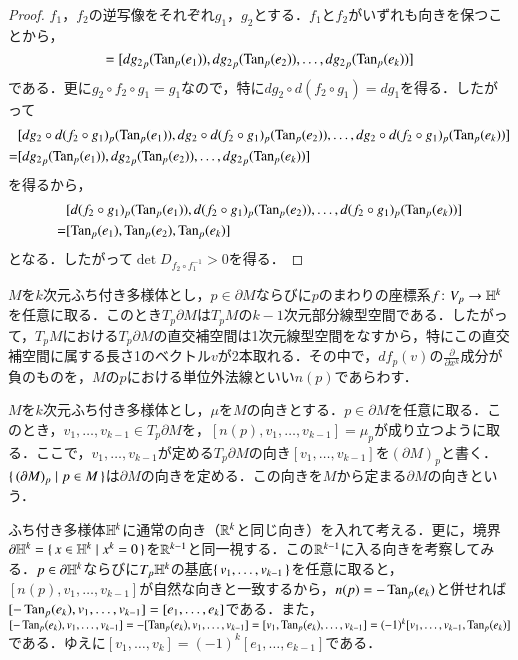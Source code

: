 \begin{proof}$f_1$，$f_2$の逆写像をそれぞれ$g_1$，$g_2$とする．$f_1$と$f_2$がいずれも向きを保つことから，
\begin{equation}
[d{g_1}_p(\Tan_p(e_1)), d{g_1}_p(\Tan_p(e_2)), \dots, d{g_1}_p(\Tan_p(e_k))] = [d{g_2}_p(\Tan_p(e_1)), d{g_2}_p(\Tan_p(e_2)), \dots, d{g_2}_p(\Tan_p(e_k))]
\end{equation}
である．更に$g_2 \circ f_2 \circ g_1 = g_1$なので，特に$dg_2 \circ d(f_2 \circ g_1) = dg_1$を得る．したがって
\begin{align}
& [dg_2 \circ d(f_2 \circ g_1)_p(\operatorname{Tan}_p(e_1)), dg_2 \circ d(f_2 \circ g_1)_p(\operatorname{Tan}_p(e_2)), \dots, dg_2 \circ d(f_2 \circ g_1)_p(\operatorname{Tan}_p(e_k))] \\
= &[d{g_2}_p(\operatorname{Tan}_p(e_1)), d{g_2}_p(\operatorname{Tan}_p(e_2)), \dots, d{g_2}_p(\operatorname{Tan}_p(e_k))]
\end{align}を得るから，
\begin{align}
& [d(f_2 \circ g_1)_p(\operatorname{Tan}_p(e_1)), d(f_2 \circ g_1)_p(\operatorname{Tan}_p(e_2)), \dots, d(f_2 \circ g_1)_p(\operatorname{Tan}_p(e_k))] \\
= &[\operatorname{Tan}_p(e_1), \operatorname{Tan}_p(e_2), \operatorname{Tan}_p(e_k)]
\end{align}となる．したがって$\det D_{f_2 \circ f_1^{-1}} > 0$を得る．
\end{proof}

\begin{defi}
$M$を$k$次元ふち付き多様体とし，$p \in \partial M$ならびに$p$のまわりの座標系$f \colon V_p \to \mathbb{H}^k$を任意に取る．このとき$T_p \partial M$は$T_pM$の$k-1$次元部分線型空間である．したがって，$T_pM$における$T_p \partial M$の直交補空間は1次元線型空間をなすから，特にこの直交補空間に属する長さ1のベクトル$v$が2本取れる．その中で，$df_p(v)$の$\frac{\partial}{\partial x^k}$成分が負のものを，$M$の$p$における単位外法線といい$n(p)$であらわす．
\end{defi}

\begin{defi}
$M$を$k$次元ふち付き多様体とし，$\mu$を$M$の向きとする．$p \in \partial M$を任意に取る．このとき，$v_1, \dots, v_{k-1} \in T_p \partial M$を，$[n(p), v_1, \dots, v_{k-1}] = \mu_p$が成り立つように取る．ここで，$v_1, \dots, v_{k-1}$が定める$T_p \partial M$の向き$[v_1, \dots, v_{k-1}]$を$(\partial M)_p$と書く．$\set{(\partial M)_p | p \in M}$は$\partial M$の向きを定める．この向きを$M$から定まる$\partial M$の向きという．
\end{defi}

\begin{exm}
ふち付き多様体$\mathbb{H}^k$に通常の向き（$\mathbb{R}^k$と同じ向き）を入れて考える．更に，境界$\partial \mathbb{H}^k = \set{x \in \mathbb{H}^k | x^k=0 }$を$\mathbb{R}^{k-1}$と同一視する．この$\mathbb{R}^{k-1}$に入る向きを考察してみる．$p \in \partial \mathbb{H}^k$ならびに$T_p\mathbb{H}^k$の基底$\set{v_1, \dots, v_{k-1}}$を任意に取ると，$[n(p), v_1, \dots, v_{k-1}]$が自然な向きと一致するから，$n(p) = -\operatorname{Tan}_p(e_k)$と併せれば$[-\operatorname{Tan}_p(e_{k}), v_1, \dots, v_{k-1}] = [e_1, \dots, e_k]$である．また，$[-\operatorname{Tan}_p(e_{k}), v_1, \dots, v_{k-1}] = -[\operatorname{Tan}_p(e_{k}), v_1, \dots, v_{k-1}] = [v_1, \operatorname{Tan}_p(e_{k}), \dots, v_{k-1}] = (-1)^k [v_1, \dots, v_{k-1}, \operatorname{Tan}_p(e_{k})]$である．ゆえに$[v_1, \dots, v_k] = (-1)^k [e_1, \dots, e_{k-1}]$である．
\end{exm}

